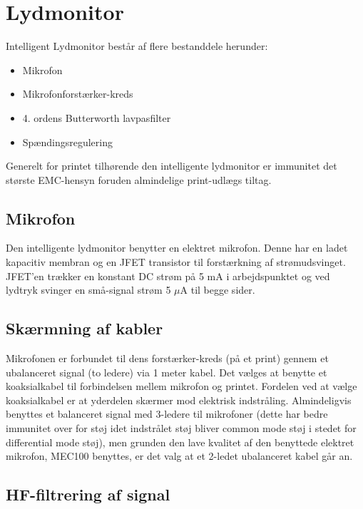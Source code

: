 \chapter{Lydmonitor}

Intelligent Lydmonitor består af flere bestanddele herunder:

\begin{itemize}
\item Mikrofon
\item Mikrofonforstærker-kreds
\item 4. ordens Butterworth lavpasfilter 
\item Spændingsregulering
\end{itemize}

Generelt for printet tilhørende den intelligente lydmonitor er immunitet det største EMC-hensyn foruden almindelige print-udlægs tiltag.

\section{Mikrofon}

Den intelligente lydmonitor benytter en elektret mikrofon. Denne har en ladet kapacitiv membran og en JFET transistor til forstærkning af strømudsvinget. JFET’en trækker en konstant DC strøm på 5 mA i arbejdspunktet og ved lydtryk svinger en små-signal strøm 5 $\mu$A til begge sider. 

\section{Skærmning af kabler}

Mikrofonen er forbundet til dens forstærker-kreds (på et print) gennem et ubalanceret signal (to ledere) via 1 meter kabel. Det vælges at benytte et koaksialkabel til forbindelsen mellem mikrofon og printet. Fordelen ved at vælge koaksialkabel er at yderdelen skærmer mod elektrisk indstråling. Almindeligvis benyttes et balanceret signal med 3-ledere til mikrofoner (dette har bedre immunitet over for støj idet indstrålet støj bliver common mode støj i stedet for differential mode støj), men grunden den lave kvalitet af den benyttede elektret mikrofon, MEC100 benyttes, er det valg at et 2-ledet ubalanceret kabel går an.


\section{HF-filtrering af signal}

